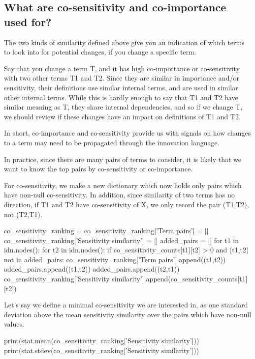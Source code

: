 \subsection{What are co-sensitivity and co-importance used for?}
\label{c7:s4:ss3}
The two kinds of similarity defined above give you an indication of which terms to look into for potential changes, if you change a specific term.

Say that you change a term T, and it has high co-importance or co-sensitivity with two other terms T1 and T2. Since they are similar in importance and/or sensitivity, their definitions use similar internal terms, and are used in similar other internal terms. While this is hardly enough to say that T1 and T2 have similar meaning as T, they share internal dependencies, and so if we change T, we should review if these changes have an impact on definitions of T1 and T2.

In short, co-importance and co-sensitivity provide us with signals on how changes to a term may need to be propagated through the innovation language.

In practice, since there are many pairs of terms to consider, it is likely that we want to know the top pairs by co-sensitivity or co-importance.

For co-sensitivity, we make a new dictionary which now holds only pairs which have non-null co-sensitivity. In addition, since similarity of two terms has no direction, if T1 and T2 have co-sensitivity of X, we only record the pair (T1,T2), not (T2,T1).

\begin{pycode}
co_sensitivity_ranking = {}
co_sensitivity_ranking['Term pairs'] = []
co_sensitivity_ranking['Sensitivity similarity'] = []
added_pairs = []
for t1 in idn.nodes():
    for t2 in idn.nodes():
        if co_sensitivity_counts[t1][t2] > 0 and (t1,t2) not in added_pairs:
                co_sensitivity_ranking['Term pairs'].append((t1,t2))
                added_pairs.append((t1,t2))
                added_pairs.append((t2,t1))
                co_sensitivity_ranking['Sensitivity similarity'].append(co_sensitivity_counts[t1][t2])
\end{pycode}

Let's say we define a minimal co-sensitivity we are interested in, as one standard deviation above the mean sensitivity similarity over the pairs which have non-null values.

\begin{pycode}
print(stat.mean(co_sensitivity_ranking['Sensitivity similarity']))
print(stat.stdev(co_sensitivity_ranking['Sensitivity similarity']))
\end{pycode}

